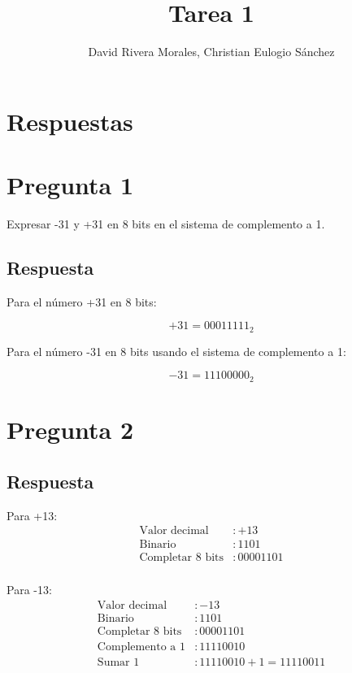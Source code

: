 \documentclass{article}
\begin{document}


\newpage
\title{Tarea 1}
\author{David Rivera Morales, Christian Eulogio Sánchez}

\maketitle
\section*{Respuestas}


\section*{Pregunta 1}
Expresar -31 y +31 en 8 bits en el sistema de complemento a 1.

\subsection*{Respuesta}
Para el número +31 en 8 bits:

\[
+31 = 00011111_{2}
\]

Para el número -31 en 8 bits usando el sistema de complemento a 1:

\[
-31 = 11100000_{2}
\]

\section*{Pregunta 2}

\subsection*{Respuesta}
Para +13:
\begin{align*}
\text{Valor decimal} & : +13 \\
\text{Binario} & : 1101 \\
\text{Completar 8 bits} & : 00001101 \\
\end{align*}

Para -13:
\begin{align*}
\text{Valor decimal} & : -13 \\
\text{Binario} & : 1101 \\
\text{Completar 8 bits} & : 00001101 \\
\text{Complemento a 1} & : 11110010 \\
\text{Sumar 1} & : 11110010 + 1 = 11110011 \\
\end{align*}
\end{document}
